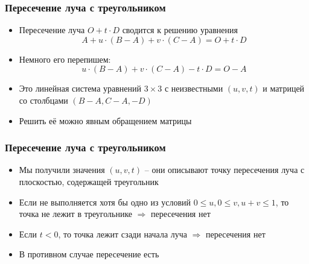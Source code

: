 \documentclass[10pt]{beamer}
\begin{document}
\begin{frame}
\frametitle{Пересечение луча с треугольником}
\begin{itemize}
\item Пересечение луча \begin{math}O + t\cdot D\end{math} сводится к решению уравнения
\begin{equation*}
A + u\cdot (B-A) + v\cdot (C-A) = O + t\cdot D
\end{equation*}
\pause
\item Немного его перепишем:
\begin{equation*}
u\cdot (B-A) + v\cdot (C-A) - t\cdot D = O - A
\end{equation*}
\pause
\item Это линейная система уравнений \begin{math}3\times 3\end{math} с неизвестными \begin{math}(u,v,t)\end{math} и матрицей со столбцами \begin{math}(B-A, C-A, -D)\end{math}
\pause
\item Решить её можно явным обращением матрицы
\end{itemize}
\end{frame}

\begin{frame}
\frametitle{Пересечение луча с треугольником}
\begin{itemize}
\item Мы получили значения \begin{math}(u,v,t)\end{math} -- они описывают точку пересечения луча с плоскостью, содержащей треугольник
\pause
\item Если не выполняется хотя бы одно из условий \begin{math}0\leq u, 0\leq v, u+v \leq 1\end{math}, то точка не лежит в треугольнике \begin{math}\Longrightarrow\end{math} пересечения нет
\pause
\item Если \begin{math}t < 0\end{math}, то точка лежит сзади начала луча \begin{math}\Longrightarrow\end{math} пересечения нет
\pause
\item В противном случае пересечение есть
\end{itemize}
\end{frame}
\end{document}
